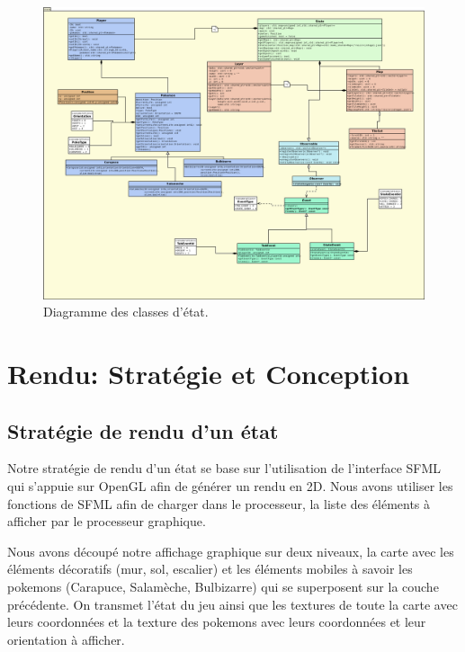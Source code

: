 \documentclass[a4paper,12pt]{article}
\begin{document}
    \begin{landscape}
    \begin{figure}[p]
    \includegraphics[width=0.8\paperheight]{state.png}
    \caption{\label{uml:state}Diagramme des classes d'état.}
    \end{figure}
    \end{landscape}
    \clearpage
    
    
    \section{Rendu: Stratégie et Conception}

    \subsection{Stratégie de rendu d'un état}
    
Notre stratégie de rendu d'un état se base sur l'utilisation de l'interface SFML qui s'appuie sur OpenGL afin de générer un rendu en 2D. Nous avons utiliser les fonctions de SFML afin de charger dans le processeur, la liste des éléments à afficher par le processeur graphique. 
    
Nous avons découpé notre affichage graphique sur deux niveaux, la carte avec les éléments décoratifs (mur, sol, escalier) et les éléments mobiles à savoir les pokemons (Carapuce, Salamèche, Bulbizarre) qui se superposent sur la couche précédente. On transmet l'état du jeu ainsi que les textures de toute la carte avec leurs coordonnées et la texture des pokemons avec leurs coordonnées et leur orientation à afficher.
        
\end{document}
